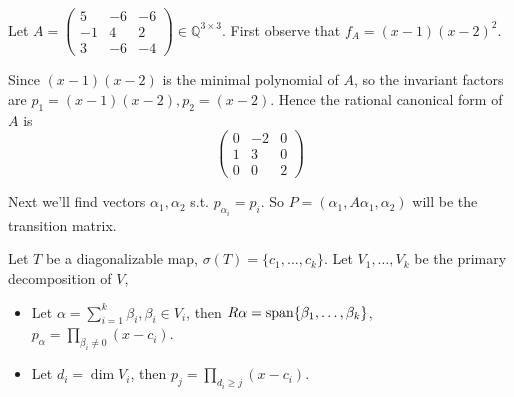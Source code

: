 \begin{example}
    Let $A = \begin{pmatrix}
		5 &-6 &-6\\ -1 &4 &2 \\ 3 &-6 &-4
    \end{pmatrix}\in \mathbb{Q}^{3\times 3}$.
	First observe that $f_A = (x-1)(x-2)^2$.

	Since $(x-1)(x-2)$ is the minimal polynomial of $A$,
	so the invariant factors are $p_1 = (x-1)(x-2), p_2 = (x-2)$.
	Hence the rational canonical form of $A$ is
	\[
	\begin{pmatrix}
		0 &-2 &0\\ 1 &3 &0\\ 0 &0 &2
	\end{pmatrix}
	\]

	Next we'll find vectors $\alpha_1,\alpha_2$ s.t. $p_{\alpha_i} = p_i$.
	So $P = (\alpha_1, A\alpha_1, \alpha_2)$ will be the transition matrix.
\end{example}

\begin{proposition}
	Let $T$ be a diagonalizable map, $\sigma(T)=\{c_1,\dots,c_k\}$.
	Let $V_1,\dots,V_k$ be the primary decomposition of $V$,
	\begin{itemize}
		\item Let $\alpha = \sum_{i=1}^{k} \beta_i, \beta_i\in V_i$,
			then $R\alpha = \operatorname{span}\{\beta_1,\dots,\beta_k\}$,
			$p_\alpha = \prod_{\beta_i\ne 0}(x-c_i) $.
		\item Let $d_i=\dim V_i$, then $p_j = \prod_{d_i\ge j}(x-c_i)$.
	\end{itemize}
\end{proposition}
